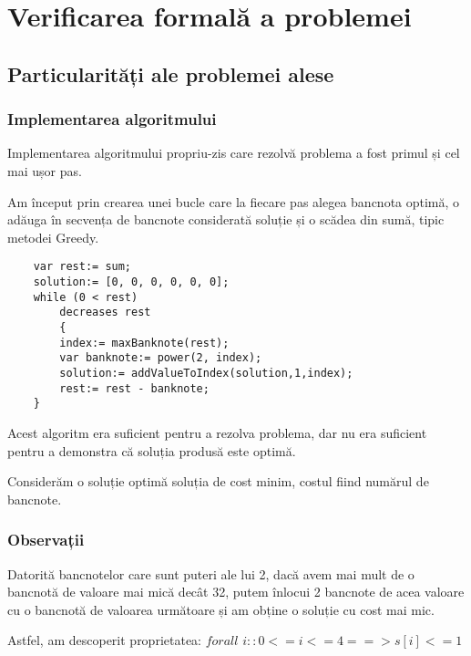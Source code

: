 
\chapter{Verificarea formală a problemei}


\section{Particularități ale problemei alese}
    \subsection{Implementarea algoritmului}
    Implementarea algoritmului propriu-zis care rezolvă problema a fost primul și cel mai ușor pas.\par
    Am început prin crearea unei bucle care la fiecare pas alegea bancnota optimă, o adăuga în secvența de 
    bancnote considerată soluție și o scădea din sumă, tipic metodei Greedy.
    \begin{lstlisting}
    var rest:= sum;
    solution:= [0, 0, 0, 0, 0, 0];
    while (0 < rest)
        decreases rest 
        {
        index:= maxBanknote(rest);
        var banknote:= power(2, index);
        solution:= addValueToIndex(solution,1,index);
        rest:= rest - banknote;
    }
    \end{lstlisting}
    
    Acest algoritm era suficient pentru a rezolva problema, dar nu era suficient pentru a demonstra că soluția produsă este optimă.\par
    Considerăm o soluție optimă soluția de cost minim, costul fiind numărul de bancnote.
    \subsection{Observații}
    Datorită bancnotelor care sunt puteri ale lui 2, dacă avem mai mult de o bancnotă de valoare mai mică decât 32,
    putem înlocui 2 bancnote de acea valoare cu o bancnotă de valoarea următoare și am obține o soluție cu cost mai mic.\par
    Astfel, am descoperit proprietatea: 
    $  forall$ $i :: 0 <= i <= 4 ==> s[i] <= 1 $




